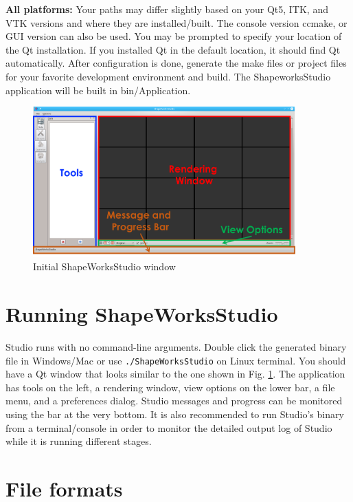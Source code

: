 \documentclass[letterpaper,12pt]{article}   %
\begin{document}
\vspace{0.1in}
\noindent\textbf{All platforms:} Your paths may differ slightly based on your Qt5, ITK, and VTK versions and where they are installed/built. The console version ccmake, or GUI version can also be used. You may be prompted to specify your location of the Qt installation. If you installed Qt in the default location, it should find Qt automatically. After configuration is done, generate the make files or project files for your favorite development environment and build. The ShapeworksStudio application will be built in bin/Application.
\vspace{0.1in}
\begin{figure}[!htp]
	\centering
	\includegraphics[width=0.9\textwidth]{figs_v2/qtwin.png}
	\caption{Initial ShapeWorksStudio window}
	\label{fig:qtwin}
\end{figure}

\section{Running ShapeWorksStudio}

Studio runs with no command-line arguments. Double click the generated binary file in Windows/Mac or use \texttt{./ShapeWorksStudio} on Linux terminal.  You should have a Qt window that looks similar to the one shown in Fig. \ref{fig:qtwin}. The application has tools on the left, a rendering window, view options on the lower bar, a file menu, and a preferences dialog. Studio messages and progress can be monitored using the bar at the very bottom. It is also recommended to run Studio's binary from a terminal/console in order to monitor the detailed output log of Studio while it is running different stages.

\section{File formats}
\end{document}
